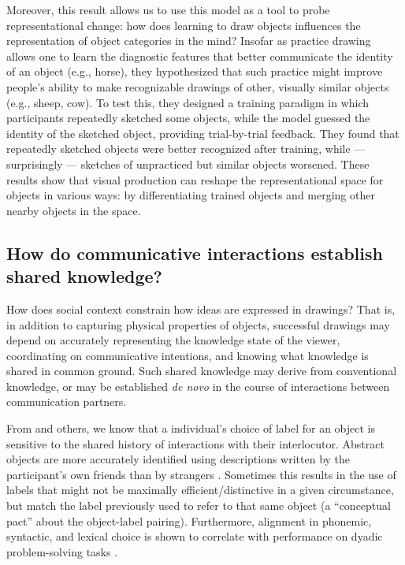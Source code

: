 \documentclass[12pt]{article}
\begin{document}
Moreover, this result allows us to use this model as a tool to probe representational change: how does learning to draw objects influences the representation of object categories in the mind? Insofar as practice drawing allows one to learn the diagnostic features that better communicate the identity of an object (e.g., horse), they hypothesized that such practice might improve people's ability to make recognizable drawings of other, visually similar objects (e.g., sheep, cow). To test this, they designed a training paradigm in which participants repeatedly sketched some objects, while the model guessed the identity of the sketched object, providing trial-by-trial feedback. They found that repeatedly sketched objects were better recognized after training, while --- surprisingly --- sketches of unpracticed but similar objects worsened. These results show that visual production can reshape the representational space for objects in various ways: by differentiating trained objects and merging other nearby objects in the space.

\subsection{How do communicative interactions establish shared knowledge?}

How does social context constrain how ideas are expressed in drawings? That is, in addition to capturing physical properties of objects, successful drawings may depend on accurately representing the knowledge state of the viewer, coordinating on communicative intentions, and knowing what knowledge is shared in common ground. Such shared knowledge may derive from conventional knowledge, or may be established \textit{de novo} in the course of interactions between communication partners.

From  and others, we know that a individual's choice of label for an object is sensitive to the shared history of interactions with their interlocutor. Abstract objects are more accurately identified using descriptions written by the participant's own friends than by strangers \cite{fussell1989understanding}. Sometimes this results in the use of labels that might not be maximally efficient/distinctive in a given circumstance, but match the label previously used to refer to that same object (a ``conceptual pact'' about the object-label pairing). Furthermore, alignment in  phonemic, syntactic, and lexical choice is shown to correlate with performance on dyadic problem-solving tasks \cite{FusaroliBahrami2012}.
\end{document}
